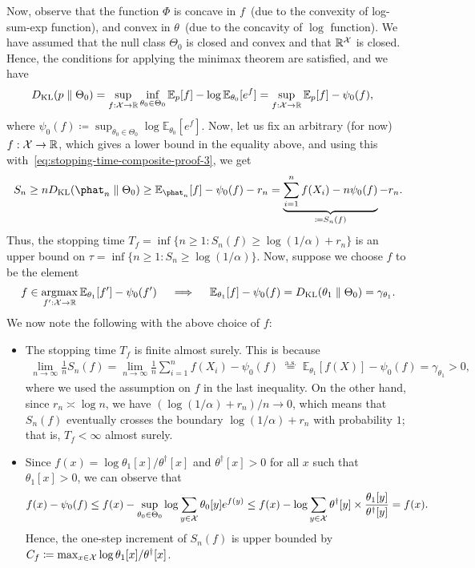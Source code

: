 \documentclass[12pt]{article}
\begin{document}
Now, observe that the function $\Phi$ is concave in $f$~(due to the convexity of log-sum-exp function), and convex in  $\theta$~(due to the concavity of $\log$ function). We have assumed that the null class $\Theta_0$ is closed and convex and that $\mathbb{R}^{{\cal X}}$ is closed. Hence, the conditions for applying the minimax theorem are satisfied, and we have 
\begin{align}
    &D_{\text{KL}}(p \parallel \Theta_0) = \sup_{f:{\cal X} \to \mathbb{R}} \inf_{\theta_0 \in \Theta_0} \mathbb{E}_p[f] - \log \mathbb{E}_{\theta_0}[e^f] =  \sup_{f:{\cal X} \to \mathbb{R}}  \mathbb{E}_p[f] - \psi_0(f), 
\end{align}
where  $\psi_0(f) \coloneqq \sup_{\theta_0 \in \Theta_0} \log \mathbb{E}_{\theta_0}[e^f]$.  Now, let us fix an arbitrary (for now) $f:{\cal X} \to \mathbb{R}$, which gives a lower bound in the equality above, and using this with~\eqref{eq:stopping-time-composite-proof-3}, we get 
\begin{align}
S_n \geq n \dkl(\phat_n \parallel \Theta_0) \geq \mathbb{E}_{\phat_n}[f] - \psi_0(f) - r_n = \underbrace{\sum_{i=1}^n f(X_i) - n \psi_0(f)}_{\coloneqq S_n(f)} - r_n. 
\end{align}
Thus, the stopping time $T_f = \inf \{n \geq 1: S_n(f) \geq \log(1/\alpha) + r_n\}$ is an upper bound on $\tau = \inf \{n \geq 1 : S_n \geq \log(1/\alpha)\}$. Now, suppose we choose $f$ to be the element 
\begin{align}
    f \in \operatorname*{argmax}_{f':{\cal X} \to \mathbb{R}} \mathbb{E}_{\theta_1}[f'] - \psi_0(f')  \quad \implies \quad \mathbb{E}_{\theta_1}[f] - \psi_0(f) = D_{\text{KL}}(\theta_1 \parallel \Theta_0) = \gamma_{\theta_1}. 
\end{align}
We now note the following with the above choice of $f$: 
\begin{itemize}
    \item The stopping time $T_f$ is finite almost surely. This is because 
    \begin{align}
        \lim_{n \to \infty} \frac{1}{n} S_n(f) = \lim_{n \to \infty} \frac{1}{n} \sum_{i=1}^n f(X_i) - \psi_0(f) \; \stackrel{\mathrm{a.s.}}{=}\; \mathbb{E}_{\theta_1}[f(X)] - \psi_0(f) = \gamma_{\theta_1}>0, 
    \end{align}
    where we used the assumption on $f$ in the last inequality. On the other hand, since $r_n \asymp \log n$, we have  $(\log(1/\alpha) + r_n)/n \to 0$, which means that $S_n(f)$ eventually crosses the boundary $\log(1/\alpha) + r_n$ with probability $1$; that is, $T_f < \infty$ almost surely.   

\item Since $f(x) = \log \theta_1[x]/\theta^\dagger[x]$ and $\theta^\dagger[x]>0$ for all $x$ such that $\theta_1[x]>0$, we can observe that 
\begin{align}
    f(x) - \psi_0(f) \leq f(x) - \sup_{\theta_0\in \Theta_0} \log \sum_{y \in {\cal X}} \theta_0[y]e^{f(y)} \leq f(x) - \log \sum_{y \in {\cal X}} \theta^\dagger[y] \times\frac{\theta_1[y]}{\theta^\dagger[y]} = f(x). 
\end{align}
    Hence, the one-step increment of $S_n(f)$ is upper bounded by $C_f \coloneqq \max_{x \in {\cal X}} \log \theta_1[x]/\theta^\dagger[x]$. 
\end{itemize}
\end{document}
